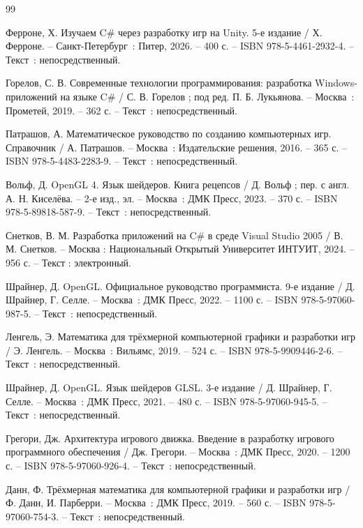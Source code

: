 
\begin{thebibliography}{99}
	
	 Ферроне, Х. Изучаем C\# через разработку игр на Unity. 5-е издание / Х. Ферроне. – Санкт-Петербург~: Питер, 2026. – 400 с. – ISBN 978-5-4461-2932-4. – Текст~: непосредственный.
	
	 Горелов, С. В. Современные технологии программирования: разработка Windows-приложений на языке C\# / С. В. Горелов ; под ред. П. Б. Лукьянова. – Москва~: Прометей, 2019. – 362 с. – Текст~: непосредственный.
	
	 Патрашов, А. Математическое руководство по созданию компьютерных игр. Справочник / А. Патрашов. – Москва~: Издательские решения, 2016. – 365 с. – ISBN 978-5-4483-2283-9. – Текст~: непосредственный.
	
	 Вольф, Д. OpenGL 4. Язык шейдеров. Книга рецепсов / Д. Вольф ; пер. с англ. А. Н. Киселёва. – 2-е изд., эл. – Москва~: ДМК Пресс, 2023. – 370 с. – ISBN 978-5-89818-587-9. – Текст~: непосредственный.
	
	 Снетков, В. М. Разработка приложений на C\# в среде Visual Studio 2005 / В. М. Снетков. – Москва : Национальный Открытый Университет ИНТУИТ, 2024. – 956 с. – Текст : электронный.
	
	 Шрайнер, Д. OpenGL. Официальное руководство программиста. 9-е издание / Д. Шрайнер, Г. Селле. – Москва~: ДМК Пресс, 2022. – 1100 с. – ISBN 978-5-97060-987-5. – Текст~: непосредственный.
	
	 Ленгель, Э. Математика для трёхмерной компьютерной графики и разработки игр / Э. Ленгель. – Москва~: Вильямс, 2019. – 524 с. – ISBN 978-5-9909446-2-6. – Текст~: непосредственный.
	
	 Шрайнер, Д. OpenGL. Язык шейдеров GLSL. 3-е издание / Д. Шрайнер, Г. Селле. – Москва~: ДМК Пресс, 2021. – 480 с. – ISBN 978-5-97060-945-5. – Текст~: непосредственный.
	
	 Грегори, Дж. Архитектура игрового движка. Введение в разработку игрового программного обеспечения / Дж. Грегори. – Москва~: ДМК Пресс, 2020. – 1200 с. – ISBN 978-5-97060-926-4. – Текст~: непосредственный.
	
	 Данн, Ф. Трёхмерная математика для компьютерной графики и разработки игр / Ф. Данн, И. Парберри. – Москва~: ДМК Пресс, 2019. – 560 с. – ISBN 978-5-97060-754-3. – Текст~: непосредственный.
	

\end{thebibliography}
